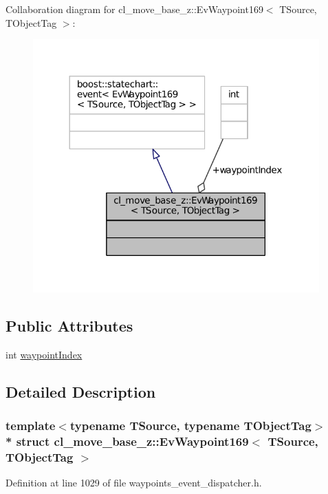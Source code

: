 Collaboration diagram for cl\+\_\+move\+\_\+base\+\_\+z\+:\+:Ev\+Waypoint169$<$ T\+Source, T\+Object\+Tag $>$\+:
\nopagebreak
\begin{figure}[H]
\begin{center}
\leavevmode
\includegraphics[width=312pt]{structcl__move__base__z_1_1EvWaypoint169__coll__graph}
\end{center}
\end{figure}
\subsection*{Public Attributes}
\begin{DoxyCompactItemize}
\item 
int \hyperlink{structcl__move__base__z_1_1EvWaypoint169_a4fdb3343d1e9a763ee1181ecd47b25f7}{waypoint\+Index}
\end{DoxyCompactItemize}


\subsection{Detailed Description}
\subsubsection*{template$<$typename T\+Source, typename T\+Object\+Tag$>$\\*
struct cl\+\_\+move\+\_\+base\+\_\+z\+::\+Ev\+Waypoint169$<$ T\+Source, T\+Object\+Tag $>$}



Definition at line 1029 of file waypoints\+\_\+event\+\_\+dispatcher.\+h.



